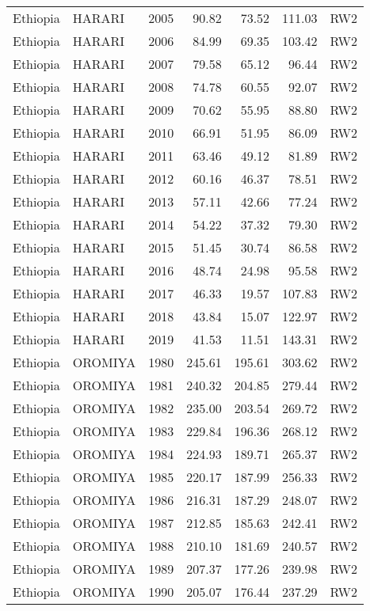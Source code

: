 \begin{longtable}{lllrrrl}
  Ethiopia & HARARI & 2005 & 90.82 & 73.52 & 111.03 & RW2 \\ 
  Ethiopia & HARARI & 2006 & 84.99 & 69.35 & 103.42 & RW2 \\ 
  Ethiopia & HARARI & 2007 & 79.58 & 65.12 & 96.44 & RW2 \\ 
  Ethiopia & HARARI & 2008 & 74.78 & 60.55 & 92.07 & RW2 \\ 
  Ethiopia & HARARI & 2009 & 70.62 & 55.95 & 88.80 & RW2 \\ 
  Ethiopia & HARARI & 2010 & 66.91 & 51.95 & 86.09 & RW2 \\ 
  Ethiopia & HARARI & 2011 & 63.46 & 49.12 & 81.89 & RW2 \\ 
  Ethiopia & HARARI & 2012 & 60.16 & 46.37 & 78.51 & RW2 \\ 
  Ethiopia & HARARI & 2013 & 57.11 & 42.66 & 77.24 & RW2 \\ 
  Ethiopia & HARARI & 2014 & 54.22 & 37.32 & 79.30 & RW2 \\ 
  Ethiopia & HARARI & 2015 & 51.45 & 30.74 & 86.58 & RW2 \\ 
  Ethiopia & HARARI & 2016 & 48.74 & 24.98 & 95.58 & RW2 \\ 
  Ethiopia & HARARI & 2017 & 46.33 & 19.57 & 107.83 & RW2 \\ 
  Ethiopia & HARARI & 2018 & 43.84 & 15.07 & 122.97 & RW2 \\ 
  Ethiopia & HARARI & 2019 & 41.53 & 11.51 & 143.31 & RW2 \\ 
  Ethiopia & OROMIYA & 1980 & 245.61 & 195.61 & 303.62 & RW2 \\ 
  Ethiopia & OROMIYA & 1981 & 240.32 & 204.85 & 279.44 & RW2 \\ 
  Ethiopia & OROMIYA & 1982 & 235.00 & 203.54 & 269.72 & RW2 \\ 
  Ethiopia & OROMIYA & 1983 & 229.84 & 196.36 & 268.12 & RW2 \\ 
  Ethiopia & OROMIYA & 1984 & 224.93 & 189.71 & 265.37 & RW2 \\ 
  Ethiopia & OROMIYA & 1985 & 220.17 & 187.99 & 256.33 & RW2 \\ 
  Ethiopia & OROMIYA & 1986 & 216.31 & 187.29 & 248.07 & RW2 \\ 
  Ethiopia & OROMIYA & 1987 & 212.85 & 185.63 & 242.41 & RW2 \\ 
  Ethiopia & OROMIYA & 1988 & 210.10 & 181.69 & 240.57 & RW2 \\ 
  Ethiopia & OROMIYA & 1989 & 207.37 & 177.26 & 239.98 & RW2 \\ 
  Ethiopia & OROMIYA & 1990 & 205.07 & 176.44 & 237.29 & RW2 \\ 

\end{longtable}
